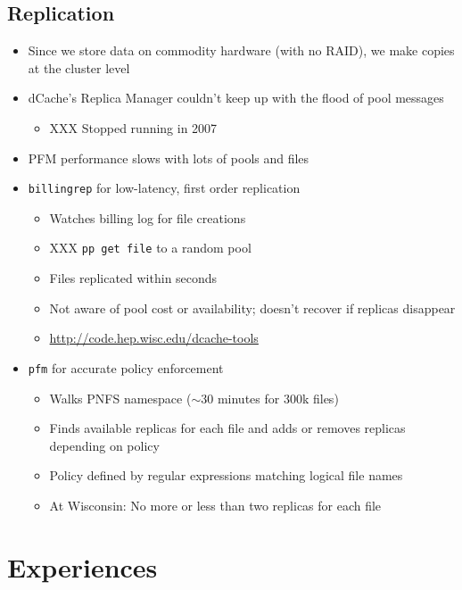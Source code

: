 \documentclass{beamer}
\newcommand{\ca}{\ensuremath{\sim}}
\begin{document}
\subsection{Replication}
\begin{frame}
\begin{itemize}
	\item Since we store data on commodity hardware (with no RAID), we make copies at the cluster level
	\item dCache's Replica Manager couldn't keep up with the flood of pool messages
	\begin{itemize}
		\item XXX Stopped running in 2007
	\end{itemize}
	\item PFM performance slows with lots of pools and files
	\item {\tt billingrep} for low-latency, first order replication
	\begin{itemize}
		\item Watches billing log for file creations
		\item XXX {\tt pp get file} to a random pool
		\item Files replicated within seconds
		\item Not aware of pool cost or availability; doesn't recover if replicas disappear
		\item \url{http://code.hep.wisc.edu/dcache-tools}
	\end{itemize}
	\item {\tt pfm} for accurate policy enforcement
	\begin{itemize}
		\item Walks PNFS namespace (\ca{}30 minutes for 300k files)
		\item Finds available replicas for each file and adds or removes replicas depending on policy
		\item Policy defined by regular expressions matching logical file names
		\item At Wisconsin: No more or less than two replicas for each file
	\end{itemize}
\end{itemize}
\end{frame}

\section{Experiences}
\end{document}
